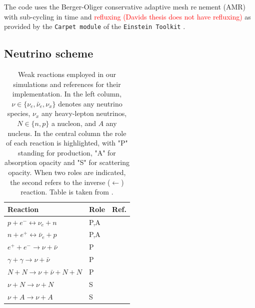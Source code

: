\documentclass[11pt,a4paper,headinclude=true,DIV=14,BCOR=8mm,chapterprefix,listof=totoc,twoside,openright,abstracton]{scrbook}
\newcommand{\red}[1]{\textcolor{red}{#1}}
\begin{document}
The code uses the Berger-Oliger conservative adaptive mesh renement (AMR) \cite{Berger:1984} with 
sub-cycling in time and \red{refluxing (Davids thesis does not have refluxing)} \cite{Berger:1989,Reisswig:2012nc} as provided by the \texttt{Carpet module} of the \texttt{Einstein Toolkit} 
\cite{Schnetter:2003rb}. 


\subsection{Neutrino scheme}


\begin{table}
    \caption{
        Weak reactions employed in our simulations and references for their implementation.
        In the left column, $\nu \in \{\nu_e, \bar{\nu}_e, \nu_{x}\}$ denotes any neutrino species, 
        $\nu_{x}$ any heavy-lepton neutrinos, $N \in\{n, p\}$ a nucleon, and $A$ any nucleus.
        In the central column the role of each reaction is highlighted, with "P" standing for 
        production, "A" for absorption opacity and "S" for scattering opacity. When two roles are
        indicated, the second refers to the inverse ($\leftarrow$) reaction.
        Table is taken from \cite{Radice:2018pdn}.
    }
    \label{tab:leakage}
    \begin{center}
        \begin{tabular}{lll}
            \hline\hline
            Reaction & Role &  Ref. \\ 
            \hline
            $p + e^- \leftrightarrow \nu_e + n $          & P,A & \cite{Bruenn:1985}  \\
            $n + e^+ \leftrightarrow \bar{\nu}_{e} + p $  & P,A & \cite{Bruenn:1985}  \\
            $e^+ + e^- \rightarrow \nu + \bar{\nu}$       & P & \cite{Ruffert:1995fs} \\
            $\gamma + \gamma \rightarrow \nu + \bar{\nu}$ & P & \cite{Ruffert:1995fs} \\
            $N + N \rightarrow \nu + \bar{\nu} + N  + N$  & P & \cite{Burrows:2004vq} \\
            $\nu + N \rightarrow \nu + N$                 & S & \cite{Ruffert:1995fs} \\
            $\nu + A \rightarrow \nu + A$                 & S & \cite{Shapiro:1983du} \\
            \hline\hline
        \end{tabular}
    \end{center}
\end{table}
\end{document}

